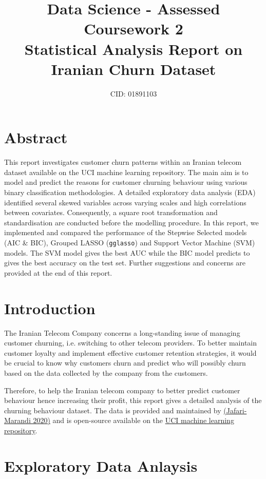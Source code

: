 \documentclass[11pt]{article}
\title{Data Science - Assessed Coursework 2 \\ \small Statistical Analysis Report on Iranian Churn Dataset}
\author{CID: 01891103}
\date{}
\begin{document}
\maketitle

\section*{Abstract}

This report investigates customer churn patterns within an Iranian telecom dataset available on the UCI machine learning repository. The main aim is to model and predict the reasons for customer churning behaviour using various binary classification methodologies. A detailed exploratory data analysis (EDA) identified several skewed variables across varying scales and high correlations between covariates. Consequently, a square root transformation and standardisation are conducted before the modelling procedure. In this report, we implemented and compared the performance of the Stepwise Selected models (AIC \& BIC), Grouped LASSO (\texttt{gglasso}) and Support Vector Machine (SVM) models. The SVM model gives the best AUC while the BIC model predicts to gives the best accuracy on the test set. Further suggestions and concerns are provided at the end of this report. 



\section{Introduction}

The Iranian Telecom Company concerns a long-standing issue of managing customer churning, i.e. switching to other telecom providers. To better maintain customer loyalty and implement effective customer retention strategies, it would be crucial to know why customers churn and predict who will possibly churn based on the data collected by the company from the customers. 

Therefore, to help the Iranian telecom company to better predict customer behaviour hence increasing their profit, this report gives a detailed analysis of the churning behaviour dataset. The data is provided and maintained by \href{https://link.springer.com/article/10.1007/s00521-020-04850-6}{(Jafari-Marandi 2020)} and is open-source available on the \href{https://archive.ics.uci.edu/dataset/563/iranian+churn+dataset}{UCI machine learning repository}. 

  
\section{Exploratory Data Anlaysis}\label{sec:EDA}
\end{document}
